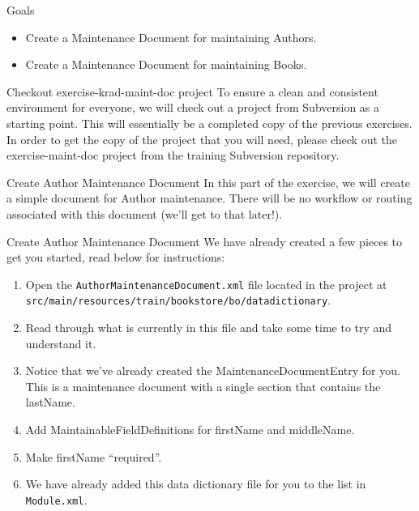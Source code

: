 \documentclass[xcolor=dvipsnames,14pt,professionalfonts]{beamer}
\begin{document}
\begin{frame}{Goals}
  \begin{itemize}
    \item Create a Maintenance Document for maintaining Authors.
    \item Create a Maintenance Document for maintaining Books.
  \end{itemize}
\end{frame}
\begin{frame}{Checkout exercise-krad-maint-doc project}
  To ensure a clean and consistent environment for everyone, we will check out a project from Subversion as a starting point.  This will essentially be a completed copy of the previous exercises.
In order to get the copy of the project that you will need, please
check out the exercise-maint-doc project from the training Subversion
repository.
\end{frame}
\begin{frame}{Create Author Maintenance Document}
  In this part of the exercise, we will create a simple document
    for Author maintenance.  There will be no workflow or routing
    associated with this document (we’ll get to that later!).
\end{frame}

\begin{frame}{Create Author Maintenance Document}
  We have already created a few pieces to get you started, read below for instructions:
  \begin{enumerate}
  \item Open the \texttt{AuthorMaintenanceDocument.xml} file located in the project at \texttt{src/main/resources/train/bookstore/bo/datadictionary}.
  \item Read through what is currently in this file and take some time to try and understand it.
  \item Notice that we’ve already created the MaintenanceDocumentEntry for you.  This is a maintenance document with a single section that contains the lastName.
  \item Add MaintainableFieldDefinitions for firstName and middleName.
  \item Make firstName “required”.
  \item We have already added this data dictionary file for you to the list in \texttt{Module.xml}.
  \end{enumerate}
\end{frame}
\end{document}
